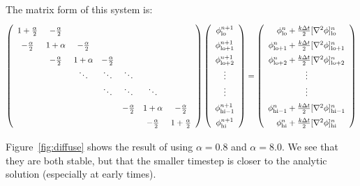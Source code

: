 The matrix form of this system is:
\newcommand{\atwo}{\frac{\alpha}{2}}
\begin{equation}
\label{eq:diff:cnmatrix}
\renewcommand\arraystretch{1.5}
\left (
\begin{array}{ccccccc}
1+\atwo &   -\atwo &          &        &        &           &          \\
-\atwo  & 1+\alpha & -\atwo   &        &        &           &          \\
        &   -\atwo & 1+\alpha & -\atwo &        &           &          \\
        &          & \ddots   & \ddots & \ddots &           &          \\
        &          &          & \ddots & \ddots & \ddots    &          \\
        &          &          &        & -\atwo & 1+\alpha  &-\atwo   \\
        &          &          &        &        & -\atwo    &1+\atwo \\
\end{array}
\right )
\left (
\begin{array}{c}
\phi_\mathrm{lo}^{n+1} \\
\phi_\mathrm{lo+1}^{n+1} \\
\phi_\mathrm{lo+2}^{n+1} \\
\vdots \\
\vdots \\
\phi_\mathrm{hi-1}^{n+1} \\
\phi_\mathrm{hi}^{n+1} \\
\end{array}
\right )
=
\left (
\begin{array}{c}
\phi_\mathrm{lo}^{n}  + \frac{k\Delta t}{2} [\nabla^2 \phi]^n_\mathrm{lo}\\
\phi_\mathrm{lo+1}^{n} + \frac{k\Delta t}{2} [\nabla^2 \phi]^n_\mathrm{lo+1} \\
\phi_\mathrm{lo+2}^{n} + \frac{k\Delta t}{2} [\nabla^2 \phi]^n_\mathrm{lo+2}\\
\vdots \\
\vdots \\
\phi_\mathrm{hi-1}^{n} + \frac{k\Delta t}{2} [\nabla^2 \phi]^n_\mathrm{hi-1}\\
\phi_\mathrm{hi}^{n} + \frac{k\Delta t}{2} [\nabla^2 \phi]^n_\mathrm{hi}\\
\end{array}
\right )
\end{equation}

Figure~\ref{fig:diffuse} shows the result of using $\alpha = 0.8$ and $\alpha = 8.0$.  We 
see that they are both stable, but that the smaller timestep is closer to the analytic
solution (especially at early times).

